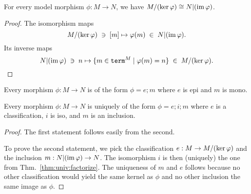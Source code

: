 \begin{theorem}\label{thm:univ:factorize}
For every model morphism $\phi:M\to N$, we have $M/(\mathrm{ker}\, \varphi)\cong N|(\mathrm{im}\, \varphi)$.
\end{theorem}
\begin{proof}
The isomorphism maps \[M/(\mathrm{ker}\, \varphi) \;\ni\;[m] \mapsto \varphi(m) \;\in\;  N|(\mathrm{im}\, \varphi).\]
Its inverse maps \[N|(\mathrm{im}\, \varphi)\;\ni\; n \mapsto \{m\in\mathtt{term}^M\;|\;\varphi(m)=n\}\;\in\; M/(\mathrm{ker}\, \varphi).\]
\end{proof}

\begin{theorem}\label{thm:univ:factorize2}
Every morphism $\phi:M\to N$ is of the form $\phi=e;m$ where $e$ is epi and $m$ is mono.

Every morphism $\phi:M\to N$ is uniquely of the form $\phi=e;i;m$ where $e$ is a classification, $i$ is iso, and $m$ is an inclusion.
\end{theorem}
\begin{proof}
The first statement follows easily from the second.

To prove the second statement, we pick the classification $e:M\to M/(\mathrm{ker}\, \varphi)$ and the inclusion $m:N|(\mathrm{im}\, \varphi)\to N$.
The isomorphism $i$ is then (uniquely) the one from Thm.~\ref{thm:univ:factorize}.
The uniqueness of $m$ and $e$ follows because no other classification would yield the same kernel as $\phi$ and no other inclusion the same image as $\phi$.
\end{proof}